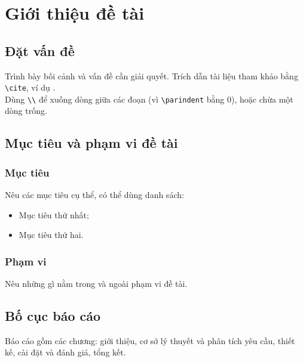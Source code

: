 \section{Giới thiệu đề tài}
\subsection{Đặt vấn đề}
Trình bày bối cảnh và vấn đề cần giải quyết. Trích dẫn tài liệu tham khảo bằng \verb|\cite|, ví dụ \cite{example2026}.\\

Dùng \verb|\\| để xuống dòng giữa các đoạn (vì \verb|\parindent| bằng 0), hoặc chừa một dòng trống.

\subsection{Mục tiêu và phạm vi đề tài}
\subsubsection{Mục tiêu}
Nêu các mục tiêu cụ thể, có thể dùng danh sách:
\begin{itemize}
  \item Mục tiêu thứ nhất;
  \item Mục tiêu thứ hai.
\end{itemize}

\subsubsection{Phạm vi}
Nêu những gì nằm trong và ngoài phạm vi đề tài.

\subsection{Bố cục báo cáo}
Báo cáo gồm các chương: giới thiệu, cơ sở lý thuyết và phân tích yêu cầu, thiết kế, cài đặt và đánh giá, tổng kết.
